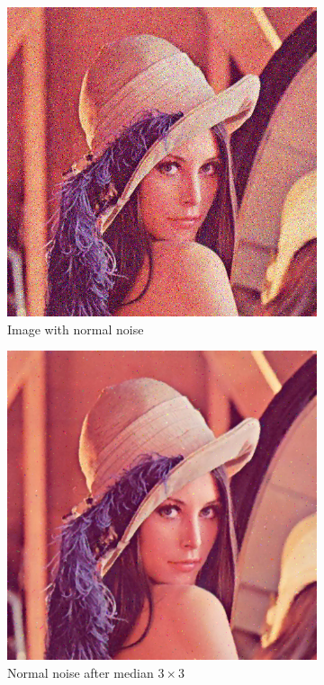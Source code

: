 \documentclass[12pt]{article}
\begin{document}
\begin{figure}[ht]
    \begin{subfigure}[t]{.4\textwidth}\centering
        \includegraphics[width=.8\textwidth]{lenac_normal3}
        \caption{Image with normal noise}
    \end{subfigure}
    \begin{subfigure}[t]{.4\textwidth}\centering
        \includegraphics[width=.8\textwidth]{lenac_normal_median}
        \caption{Normal noise after median $3\times3$}
    \end{subfigure}\\[2em]
    \begin{subfigure}[t]{.4\textwidth}\centering

\end{subfigure}
\end{figure}
\end{document}
